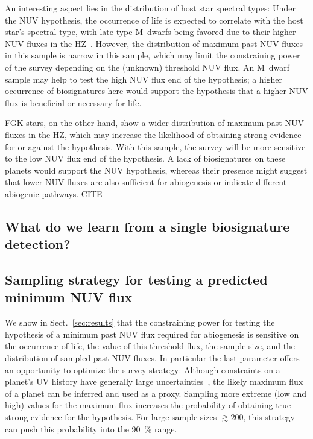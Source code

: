 \documentclass[twocolumn,twocolappendix,linenumbers]{aastex631}
\begin{document}
An interesting  aspect lies in the distribution of host star spectral types:
Under the \gls{NUV} hypothesis, the occurrence of life is expected to correlate with the host star's spectral type, with late-type M~dwarfs being favored due to their higher \gls{NUV} fluxes in the \gls{HZ}~\citep{Richey-Yowell2023}.
However, the distribution of maximum past \gls{NUV} fluxes in this sample is narrow in this sample, which may limit the constraining power of the survey depending on the (unknown) threshold \gls{NUV} flux.
An M~dwarf sample may help to test the high \gls{NUV} flux end of the hypothesis; a higher occurrence of biosignatures here would support the hypothesis that a higher NUV flux is beneficial or necessary for life.

FGK stars, on the other hand, show a wider distribution of maximum past \gls{NUV} fluxes in the \gls{HZ}, which may increase the likelihood of obtaining strong evidence for or against the hypothesis.
With this sample, the survey will be more sensitive to the low \gls{NUV} flux end of the hypothesis.
A lack of biosignatures on these planets would support the \gls{NUV} hypothesis, whereas their presence might suggest that lower NUV fluxes are also sufficient for abiogenesis or indicate different abiogenic pathways. CITE






\subsection{What do we learn from a single biosignature detection?}

\subsection{Sampling strategy for testing a predicted minimum \gls{NUV} flux}
We show in Sect.~\ref{sec:results} that the constraining power for testing the hypothesis of a minimum past \gls{NUV} flux required for abiogenesis is sensitive on the occurrence of life, the value of this threshold flux, the sample size, and the distribution of sampled past \gls{NUV} fluxes.
In particular the last parameter offers an opportunity to optimize the survey strategy: Although constraints on a planet's UV history have generally large uncertainties~\citep[e.g.,][]{Richey-Yowell2023}, the likely maximum flux of a planet can be inferred and used as a proxy.
Sampling more extreme (low and high) values for the maximum flux increases the probability of obtaining true strong evidence for the hypothesis.
For large sample sizes $\gtrsim 200$, this strategy can push this probability into the \SI{90}{\percent} range.
\end{document}
